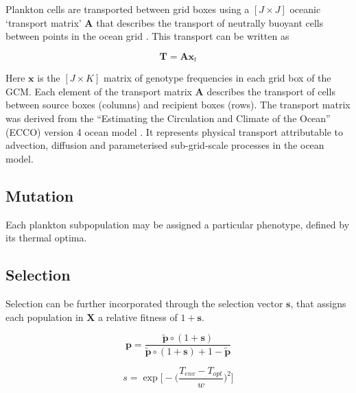 \documentclass[12pt]{article}
\begin{document}
Plankton cells are transported between grid boxes using a $[J\times J]$ oceanic `transport matrix' $\mathbf{A}$ that describes the transport of neutrally buoyant cells between points in the ocean grid \citep{Khatiwala:2005}. This transport can be written as 

\begin{equation}
\label{ }
\mathbf{T} = \mathbf{A}\mathbf{x}_{t}
\end{equation}

Here $\mathbf{x}$ is the $[J\times K]$ matrix of genotype frequencies in each grid box of the GCM. Each element of the transport matrix $\mathbf{A}$ describes the transport of cells between source boxes (columns) and recipient boxes (rows). The transport matrix was derived from the ``Estimating the Circulation and Climate of the Ocean'' (ECCO) version 4 ocean model \citep{}. It represents physical transport attributable to advection, diffusion and parameterised sub-grid-scale processes in the ocean model. 

\subsection*{Mutation}

Each plankton subpopulation may be assigned a particular phenotype, defined by its thermal optima.

\subsection*{Selection}



Selection can be further incorporated through the selection vector $\mathbf{s}$, that assigns each population in $\mathbf{X}$ a relative fitness of $1+\mathbf{s}$.

\begin{equation}
\label{ }
\mathbf{p} = \frac{\mathbf{\tilde{p}} \circ (1+\mathbf{s}) } {\mathbf{\tilde{p}} \circ (1+\mathbf{s}) + 1 -\mathbf{\tilde{p}}}
\end{equation}

\begin{equation}
s = \exp\bigg[-\Big(\frac{T_{env}-T_{opt}}{w}\Big)^2\bigg]
\end{equation}



\end{document}
